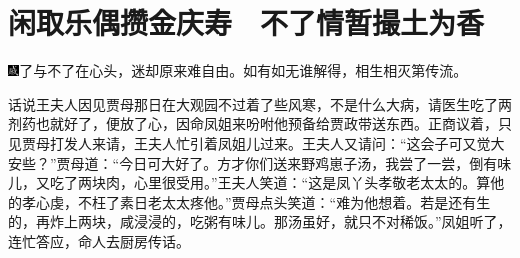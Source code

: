 

\chapter{闲取乐偶攒金庆寿　不了情暂撮土为香}\label{part0047_split_000.htmlux5cux23calibre_pb_0}

{}

{\includegraphics[width=3mm]{../Images/00005}了与不了在心头，迷却原来难自由。如有如无谁解得，相生相灭第传流。}

话说王夫人因见贾母那日在大观园不过着了些风寒，不是什么大病，请医生吃了两剂药也就好了，便放了心，因命凤姐来吩咐他预备给贾政带送东西。正商议着，只见贾母打发人来请，王夫人忙引着凤姐儿过来。王夫人又请问：``这会子可又觉大安些？''贾母道：``今日可大好了。方才你们送来野鸡崽子汤，我尝了一尝，倒有味儿，又吃了两块肉，心里很受用。''王夫人笑道：``这是凤丫头孝敬老太太的。算他的孝心虔，不枉了素日老太太疼他。''贾母点头笑道：``难为他想着。若是还有生的，再炸上两块，咸浸浸的，吃粥有味儿。那汤虽好，就只不对稀饭。''凤姐听了，连忙答应，命人去厨房传话。

